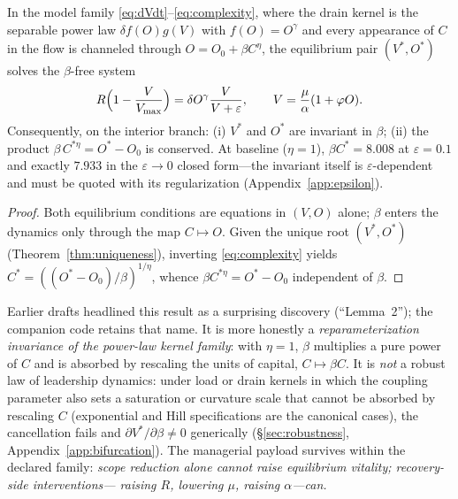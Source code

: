\begin{corollary}
\label{cor:scope}
In the model family \eqref{eq:dVdt}--\eqref{eq:complexity}, where the drain
kernel is the separable power law $\delta f(O)g(V)$ with $f(O)=O^{\gamma}$
and every appearance of $C$ in the flow is channeled through
$O=O_0+\beta C^{\eta}$, the equilibrium pair $(V^{*},O^{*})$ solves the
$\beta$-free system
\[
R\Bigl(1-\frac{V}{V_{\max}}\Bigr)=\delta O^{\gamma}\frac{V}{V+\varepsilon},
\qquad
V=\frac{\mu}{\alpha}(1+\varphi O).
\]
Consequently, on the interior branch: (i) $V^{*}$ and $O^{*}$ are invariant
in $\beta$; (ii) the product $\beta\,C^{*\eta}=O^{*}-O_0$ is conserved. At
baseline ($\eta=1$), $\beta C^{*}=8.008$ at $\varepsilon=0.1$ and exactly
$7.933$ in the $\varepsilon\to0$ closed form---the invariant itself is
$\varepsilon$-dependent and must be quoted with its regularization
(Appendix~\ref{app:epsilon}).
\end{corollary}

\begin{proof}
Both equilibrium conditions are equations in $(V,O)$ alone; $\beta$ enters
the dynamics only through the map $C\mapsto O$. Given the unique root
$(V^{*},O^{*})$ (Theorem~\ref{thm:uniqueness}), inverting
\eqref{eq:complexity} yields $C^{*}=((O^{*}-O_0)/\beta)^{1/\eta}$, whence
$\beta C^{*\eta}=O^{*}-O_0$ independent of $\beta$.
\end{proof}

\begin{remark}
\label{rem:scope}
Earlier drafts headlined this result as a surprising discovery
(``Lemma~2''); the companion code retains that name. It is more honestly a
\emph{reparameterization invariance of the power-law kernel family}: with
$\eta=1$, $\beta$ multiplies a pure power of $C$ and is absorbed by
rescaling the units of capital, $C\mapsto\beta C$. It is \emph{not} a robust
law of leadership dynamics: under load or drain kernels in which the coupling
parameter also sets a saturation or curvature scale that cannot be absorbed
by rescaling $C$ (exponential and Hill specifications are the canonical
cases), the cancellation fails and $\partial V^{*}/\partial\beta\neq0$
generically (\S\ref{sec:robustness}, Appendix~\ref{app:bifurcation}). The
managerial payload survives within the declared family: \emph{scope reduction
alone cannot raise equilibrium vitality; recovery-side interventions---%
raising $R$, lowering $\mu$, raising $\alpha$---can.}
\end{remark}

